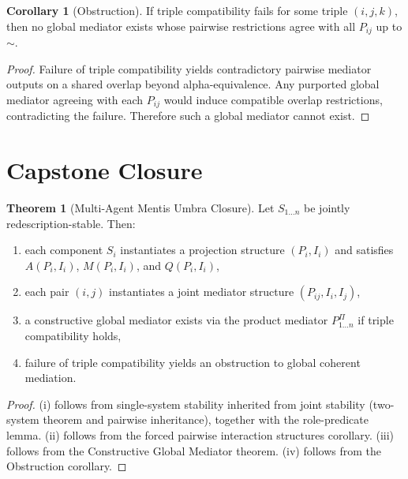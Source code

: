 \documentclass[11pt]{article}
\theoremstyle{definition}
\newtheorem{theorem}{Theorem}
\newtheorem{corollary}{Corollary}
\begin{document}
\begin{corollary}[Obstruction]
If triple compatibility fails for some triple $(i,j,k)$, then no global mediator exists whose pairwise restrictions agree with all $P_{ij}$ up to $\sim$.
\end{corollary}

\begin{proof}
Failure of triple compatibility yields contradictory pairwise mediator outputs on a shared overlap beyond alpha-equivalence.
Any purported global mediator agreeing with each $P_{ij}$ would induce compatible overlap restrictions, contradicting the failure.
Therefore such a global mediator cannot exist.
\end{proof}

\section{Capstone Closure}

\begin{theorem}[Multi-Agent Mentis Umbra Closure]
Let $S_{1\ldots n}$ be jointly redescription-stable. Then:
\begin{enumerate}[label=(\roman*)]
    \item each component $S_i$ instantiates a projection structure $(P_i,I_i)$ and satisfies $A(P_i,I_i)$, $M(P_i,I_i)$, and $Q(P_i,I_i)$,
    \item each pair $(i,j)$ instantiates a joint mediator structure $(P_{ij},I_i,I_j)$,
    \item a constructive global mediator exists via the product mediator $P^{\Pi}_{1\ldots n}$ if triple compatibility holds,
    \item failure of triple compatibility yields an obstruction to global coherent mediation.
\end{enumerate}
\end{theorem}

\begin{proof}
(i) follows from single-system stability inherited from joint stability (two-system theorem and pairwise inheritance), together with the role-predicate lemma.
(ii) follows from the forced pairwise interaction structures corollary.
(iii) follows from the Constructive Global Mediator theorem.
(iv) follows from the Obstruction corollary.
\end{proof}


\end{document}
